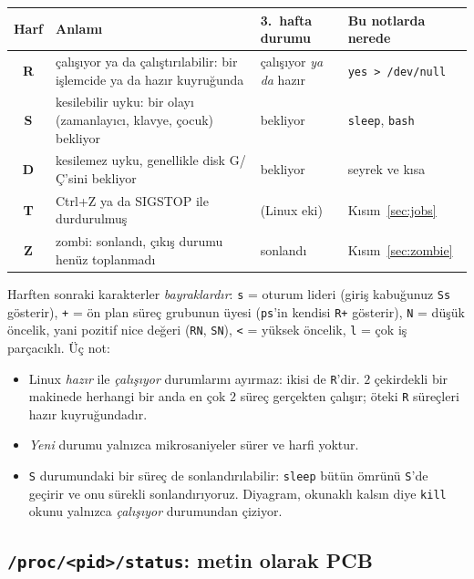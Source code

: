 \documentclass[11pt,a4paper]{article}
\newcommand{\cmd}[1]{\texttt{#1}}
\begin{document}
\begin{center}
\renewcommand{\arraystretch}{1.25}
\begin{tabularx}{\linewidth}{>{\ttfamily\bfseries}c >{\raggedright\arraybackslash}X >{\raggedright\arraybackslash}p{3.0cm} >{\raggedright\arraybackslash}p{3.2cm}}
\toprule
\textbf{\rmfamily Harf} & \textbf{Anlamı} & \textbf{3.~hafta durumu} & \textbf{Bu notlarda nerede}\\
\midrule
R & çalışıyor ya da çalıştırılabilir: bir işlemcide ya da hazır kuyruğunda & çalışıyor \emph{ya da} hazır & \cmd{yes > /dev/null}\\
S & kesilebilir uyku: bir olayı (zamanlayıcı, klavye, çocuk) bekliyor & bekliyor & \cmd{sleep}, \cmd{bash}\\
D & kesilemez uyku, genellikle disk G/Ç'sini bekliyor & bekliyor & seyrek ve kısa\\
T & Ctrl+Z ya da SIGSTOP ile durdurulmuş & (Linux eki) & Kısım~\ref{sec:jobs}\\
Z & zombi: sonlandı, çıkış durumu henüz toplanmadı & sonlandı & Kısım~\ref{sec:zombie}\\
\bottomrule
\end{tabularx}
\end{center}

Harften sonraki karakterler \emph{bayraklardır}: \texttt{s} = oturum lideri (giriş kabuğunuz \texttt{Ss} gösterir), \texttt{+} = ön plan süreç grubunun üyesi (\cmd{ps}'in kendisi \texttt{R+} gösterir), \texttt{N} = düşük öncelik, yani pozitif nice değeri (\texttt{RN}, \texttt{SN}), \texttt{<} = yüksek öncelik, \texttt{l} = çok iş parçacıklı. Üç not:
\begin{itemize}
  \item Linux \emph{hazır} ile \emph{çalışıyor} durumlarını ayırmaz: ikisi de \texttt{R}'dir. $2$ çekirdekli bir makinede herhangi bir anda en çok $2$ süreç gerçekten çalışır; öteki \texttt{R} süreçleri hazır kuyruğundadır.
  \item \emph{Yeni} durumu yalnızca mikrosaniyeler sürer ve harfi yoktur.
  \item \texttt{S} durumundaki bir süreç de sonlandırılabilir: \cmd{sleep} bütün ömrünü \texttt{S}'de geçirir ve onu sürekli sonlandırıyoruz. Diyagram, okunaklı kalsın diye \cmd{kill} okunu yalnızca \emph{çalışıyor} durumundan çiziyor.
\end{itemize}

\subsection{\texttt{/proc/<pid>/status}: metin olarak PCB}
\label{sec:proc}
\end{document}
